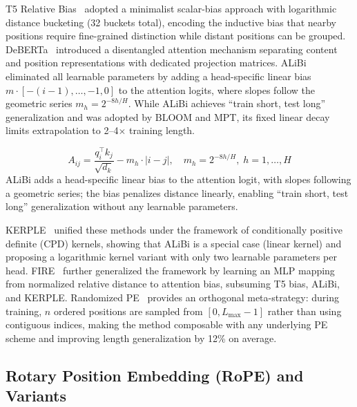 T5 Relative Bias~\cite{raffel2020exploring} adopted a minimalist scalar-bias approach with logarithmic distance bucketing (32 buckets total), encoding the inductive bias that nearby positions require fine-grained distinction while distant positions can be grouped. DeBERTa~\cite{he2021deberta} introduced a disentangled attention mechanism separating content and position representations with dedicated projection matrices. ALiBi~\cite{press2021train} eliminated all learnable parameters by adding a head-specific linear bias $m \cdot [-(i-1),\ldots,-1,0]$ to the attention logits, where slopes follow the geometric series $m_h = 2^{-8h/H}$. While ALiBi achieves ``train short, test long'' generalization and was adopted by BLOOM and MPT, its fixed linear decay limits extrapolation to 2--4$\times$ training length.

\begin{equation}
A_{ij} = \frac{q_i^\top k_j}{\sqrt{d_k}} - m_h \cdot |i - j|, \quad m_h = 2^{-8h/H}, \; h = 1, \ldots, H
\label{eq:alibi}
\end{equation}
ALiBi adds a head-specific linear bias to the attention logit, with slopes following a geometric series; the bias penalizes distance linearly, enabling ``train short, test long'' generalization without any learnable parameters.

KERPLE~\cite{chi2022kerple} unified these methods under the framework of conditionally positive definite (CPD) kernels, showing that ALiBi is a special case (linear kernel) and proposing a logarithmic kernel variant with only two learnable parameters per head. FIRE~\cite{li2024fire} further generalized the framework by learning an MLP mapping from normalized relative distance to attention bias, subsuming T5 bias, ALiBi, and KERPLE. Randomized PE~\cite{ruoss2023randomized} provides an orthogonal meta-strategy: during training, $n$ ordered positions are sampled from $[0, L_{\max}-1]$ rather than using contiguous indices, making the method composable with any underlying PE scheme and improving length generalization by 12\% on average.

\subsection{Rotary Position Embedding (RoPE) and Variants}
\label{subsec:rope}

